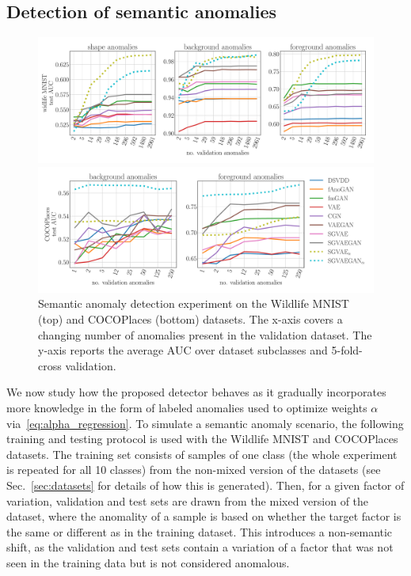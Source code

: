 \subsection{Detection of semantic anomalies} 
\begin{figure}[ht!]
    \centering
    \includegraphics[width=\textwidth]{data/chapter_sgvaegan/fig6_multifactor_experiments_wmnist.pdf}
    
    \includegraphics[width=\textwidth]{data/chapter_sgvaegan/fig7_multifactor_experiments_coco.pdf}
    \caption{Semantic anomaly detection experiment on the Wildlife MNIST (top) and COCOPlaces (bottom) datasets. The x-axis covers a changing number of anomalies present in the validation dataset. The y-axis reports the average AUC over dataset subclasses and 5-fold-cross validation.}
    \label{fig:multifactor}
\end{figure}
We now study how the proposed detector behaves as it gradually incorporates more knowledge in the form of labeled anomalies used to optimize weights $\alpha$ via~\eqref{eq:alpha_regression}. To simulate a semantic anomaly scenario, the following training and testing protocol is used with the Wildlife MNIST and COCOPlaces datasets. The training set consists of samples of one class (the whole experiment is repeated for all 10 classes) from the non-mixed version of the datasets (see Sec.~\ref{sec:datasets} for details of how this is generated). Then, for a given factor of variation, validation and test sets are drawn from the mixed version of the dataset, where the anomality of a sample is based on whether the target factor is the same or different as in the training dataset. This introduces a non-semantic shift, as the validation and test sets contain a variation of a factor that was not seen in the training data but is not considered anomalous. 

